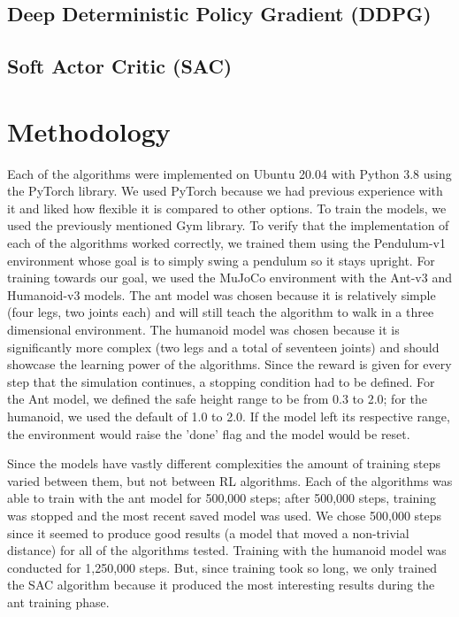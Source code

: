 \documentclass[conference]{IEEEtran}
\begin{document}
\blindtext

\subsection{Deep Deterministic Policy Gradient (DDPG)}

\blindtext

\subsection{Soft Actor Critic (SAC)}

\blindtext

\section{Methodology}

Each of the algorithms were implemented on Ubuntu 20.04 with Python 3.8 using the PyTorch library. We used PyTorch
because we had previous experience with it and liked how flexible it is compared to other options. To train the models,
we used the previously mentioned Gym library. To verify that the implementation of each of the algorithms worked
correctly, we trained them using the Pendulum-v1 environment whose goal is to simply swing a pendulum so it stays
upright. For training towards our goal, we used the MuJoCo environment with the Ant-v3 and Humanoid-v3 models. The ant
model was chosen because it is relatively simple (four legs, two joints each) and will still teach the algorithm to walk
in a three dimensional environment. The humanoid model was chosen because it is significantly more complex (two legs and
a total of seventeen joints) and should showcase the learning power of the algorithms. Since the reward is given for
every step that the simulation continues, a stopping condition had to be defined. For the Ant model, we defined the safe
height range to be from 0.3 to 2.0; for the humanoid, we used the default of 1.0 to 2.0. If the model left its
respective range, the environment would raise the 'done' flag and the model would be reset.

Since the models have vastly different complexities the amount of training steps varied between them, but not between RL
algorithms. Each of the algorithms was able to train with the ant model for 500,000 steps; after 500,000 steps, training
was stopped and the most recent saved model was used. We chose 500,000 steps since it seemed to produce good results (a
model that moved a non-trivial distance) for all of the algorithms tested. Training with the humanoid model was
conducted for 1,250,000 steps. But, since training took so long, we only trained the SAC algorithm because it produced
the most interesting results during the ant training phase.
\end{document}
